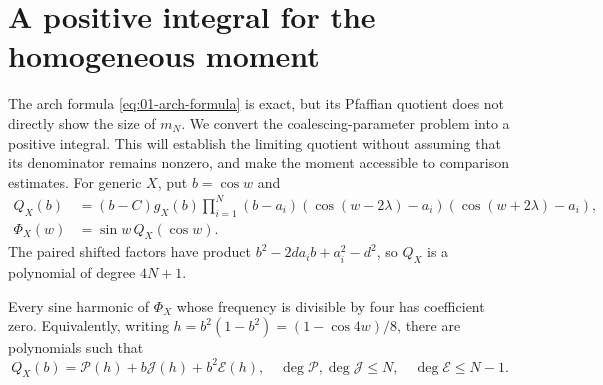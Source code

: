 \section{A positive integral for the homogeneous moment}\label{sec:integral}

The arch formula \eqref{eq:01-arch-formula} is exact, but its Pfaffian
quotient does not directly show the size of $m_N$. We convert the
coalescing-parameter problem into a positive integral. This will establish
the limiting quotient without assuming that its denominator remains
nonzero, and make the moment accessible to comparison estimates.
For generic $X$, put $b=\cos w$ and
\begin{equation}\label{eq:01-Q-definition}
 \begin{split}
 Q_X(b)&=(b-C)g_X(b)\prod_{i=1}^N
  (b-a_i)(\cos(w-2\lambda)-a_i)(\cos(w+2\lambda)-a_i),\\
 \Phi_X(w)&=\sin w\,Q_X(\cos w).
 \end{split}
\end{equation}
The paired shifted factors have product
$b^2-2da_i b+a_i^2-d^2$, so $Q_X$ is a polynomial of degree $4N+1$.

\begin{lemma}\label{lem:missing-harmonics}
Every sine harmonic of $\Phi_X$ whose frequency is divisible by four
has coefficient zero. Equivalently, writing
$h=b^2(1-b^2)=(1-\cos4w)/8$, there are polynomials such that
\begin{equation}\label{eq:01-projection}
 Q_X(b)=\mathcal P(h)+b\mathcal J(h)+b^2\mathcal E(h),
 \quad \deg\mathcal P,\deg\mathcal J\le N,
 \quad \deg\mathcal E\le N-1.
\end{equation}
\end{lemma}


